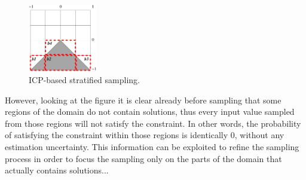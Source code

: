 \begin{figure}[h!]\label{fig:stratifiedICP}
  \centering
      \includegraphics[width=3cm]{triangle}
  \caption{ICP-based stratified sampling.}
\end{figure}

However, looking at the figure it is clear already before sampling that some regions of the domain do not contain solutions, thus every input value sampled from those regions will not satisfy the constraint. In other words, the probability of satisfying the constraint within those regions is identically 0, without any estimation uncertainty. This information can be exploited to refine the sampling process in order to focus the sampling only on the parts of the domain that actually contains solutions...







